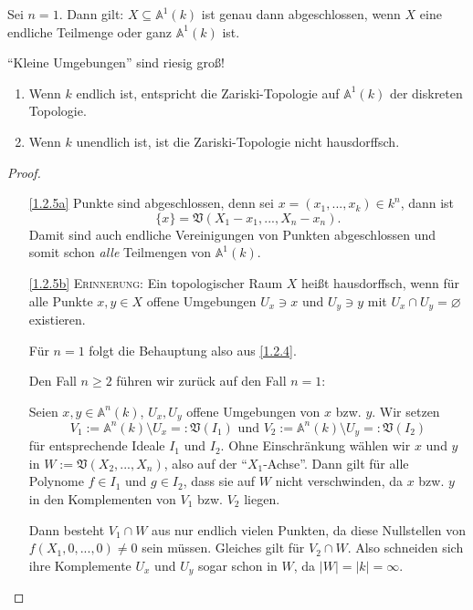 \documentclass[a4paper,12pt,index=toc]{scrbook}
\theoremstyle{keinenummern} %
\def\A{\mathbb{A}}
\def\V{\mathfrak{V}}
\newcommand{\leer}{\ensuremath{\varnothing}}
\newcommand{\card}[1]{|#1|}
\renewcommand{\dotsc}{\ensuremath{\!...}}
\begin{document}
\begin{bsp}\label{1.2.4}
Sei $n=1$. Dann gilt: $X\subseteq\A^{1}(k)$ ist genau dann abgeschlossen, wenn $X$ eine endliche Teilmenge oder ganz $\A^{1}(k)$ ist.
\end{bsp}

\begin{w}\enquote{Kleine Umgebungen} sind riesig groß!\end{w}

\begin{bem}\label{1.2.5}
\begin{enumerate}
\item{} Wenn $k$ endlich ist, entspricht die Zariski-Topologie auf $\A^{1}(k)$ der diskreten Topologie.
\item{} Wenn $k$ unendlich ist, ist die Zariski-Topologie nicht hausdorffsch.
\end{enumerate}\end{bem}
\begin{proof}\begin{enumerate}
\item[\ref{1.2.5a}] Punkte sind abgeschlossen, denn sei $x=(x_{1},\dotsc,x_{k})\in k^{n}$, dann ist
\[\{x\}=\V(X_{1}-x_{1},\dotsc,X_{n}-x_{n}).\]
Damit sind auch endliche Vereinigungen von Punkten abgeschlossen und somit schon \textit{alle} Teilmengen von $\A^{1}(k)$.
\item[\ref{1.2.5b}] {\scshape Erinnerung:} Ein topologischer Raum $X$ heißt hausdorffsch, wenn für alle Punkte $x,y\in X$ offene Umgebungen $U_{x}\ni x$ und $U_{y}\ni y$ mit $U_{x}\cap U_{y}=\leer$ existieren.

Für $n=1$ folgt die Behauptung also aus \cref{1.2.4}.

Den Fall $n\geq 2$ führen wir zurück auf den Fall $n=1$:

Seien $x,y\in\A^{n}(k)$, $U_{x},U_{y}$ offene Umgebungen von $x$ bzw. $y$. Wir setzen
\[V_{1}:=\A^{n}(k)\setminus U_{x} =: \V(I_{1})\text{ und }V_{2}:=\A^{n}(k)\setminus U_{y}=:\V(I_{2})\]
für entsprechende Ideale $I_{1}$ und $I_{2}$. Ohne  Einschränkung wählen wir $x$ und $y$ in $W:=\V(X_{2},\dotsc,X_{n})$, also auf der \enquote{$X_{1}$-Achse}. Dann gilt für alle Polynome $f\in I_{1}$ und $g\in I_{2}$, dass sie auf $W$ nicht verschwinden, da $x$ bzw. $y$ in den Komplementen von $V_{1}$ bzw. $V_{2}$ liegen.

Dann besteht $V_{1}\cap W$ aus nur endlich vielen Punkten, da diese Nullstellen von $f(X_{1},0,\dotsc,0)\neq 0$ sein müssen. Gleiches gilt für $V_{2}\cap W$. Also schneiden sich ihre Komplemente $U_{x}$ und $U_{y}$ sogar schon in $W$, da $\card{W}=\card{k}=\infty$.
\end{enumerate}\end{proof}
\end{document}
